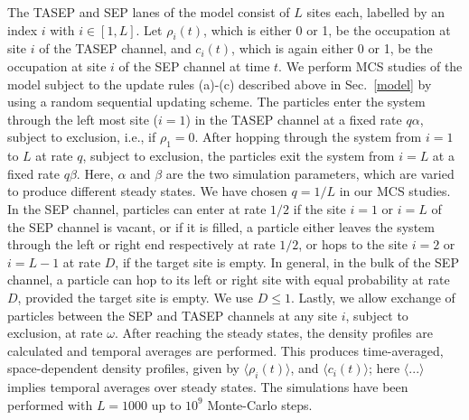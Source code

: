 \documentclass[aps,pre,twocolumn,superscriptaddress,amsmath,amssymb,longbibliography,floatfix,nofootinbib]{revtex4}
\begin{document}
The TASEP and SEP lanes of the model consist of $L$ sites each, labelled by an index $i$ with $i\in [1,L]$.
 Let $\rho_i(t)$, which is either 0 or 1, be the occupation at site $i$ of the TASEP channel, and $c_i(t)$, which is again either 0 or 1, be the occupation at site $i$ of the SEP channel  at time $t$. {We perform MCS studies of the model subject to the update rules (a)-(c) described above in Sec.~\ref{model} by using a random sequential updating scheme. The particles enter the system through the left most site ($i=1$) in the TASEP channel at a fixed rate $q\alpha$, subject to exclusion, i.e., if $\rho_1=0$. After hopping through the system from $i=1$ to $L$ at rate $q$, subject to exclusion, the particles exit the system from $i=L$ at a fixed rate $q\beta$. Here, $\alpha$ and $\beta$ are the two simulation parameters, which are varied to produce different steady states. We have chosen $q=1/L$ in our MCS studies. }In the SEP channel, particles can enter at rate $1/2$ if the site $i=1$ or $i=L$ of the SEP channel is vacant, or if it is filled, a particle either leaves the system through the left or right end respectively at rate $1/2$, or hops to the site $i=2$ or $i=L-1$ at rate $D$, if the target site is empty. In general, in the bulk of the SEP channel, a particle can hop to its left or right site with equal probability at rate $D$, provided the target site is empty. 
 {We use $D\leq 1$}. Lastly, we allow exchange of particles between the SEP and TASEP channels at any site $i$, subject to exclusion, at rate $\omega$. After reaching the steady states, the density profiles are calculated and temporal averages are performed.  This produces time-averaged, space-dependent density profiles, given by $\langle \rho_i(t)\rangle$, and $\langle c_i(t)\rangle$; here $\langle...\rangle$ implies temporal averages over steady states. The simulations have been performed with  $L=1000$ up to $10^9$ Monte-Carlo steps. %
\end{document}
